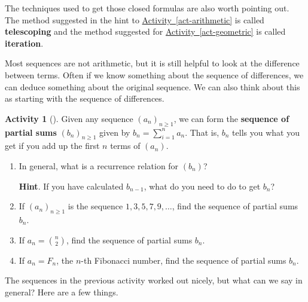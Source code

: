 \documentclass[10pt,]{book}
\newcommand{\terminology}[1]{\textbf{#1}}
\theoremstyle{plain}
\theoremstyle{definition}
\theoremstyle{definition}
\theoremstyle{definition}
\newtheorem{activity}[project]{Activity}
\numberwithin{equation}{chapter}
\begin{document}
\par
\hypertarget{p-929}{}%
The techniques used to get those closed formulas are also worth pointing out.  The method suggested in the hint to \hyperref[act-arithmetic]{Activity~\ref{act-arithmetic}} is called \terminology{telescoping} and the method suggested for \hyperref[act-geometric]{Activity~\ref{act-geometric}} is called \terminology{iteration}.%
\par
\hypertarget{p-930}{}%
Most sequences are not arithmetic, but it is still helpful to look at the difference between terms.  Often if we know something about the sequence of differences, we can deduce something about the original sequence.   We can also think about this as starting with the sequence of differences.%
\begin{activity}[]\label{activity-138}
\hypertarget{p-931}{}%
Given any sequence \((a_n)_{n \ge 1}\), we can form the \terminology{sequence of partial sums} \((b_n)_{n \ge 1}\) given by \(b_n = \sum_{i = 1}^n a_n\).  That is, \(b_n\) tells you what you get if you add up the first \(n\) terms of \((a_n)\).%
\begin{enumerate}[font=\bfseries,label=(\alph*),ref=\alph*]
\item\label{task-173} \hypertarget{p-932}{}%
In general, what is a recurrence relation for \((b_n)\)?%
\par\smallskip%
\noindent\textbf{Hint}.\hypertarget{hint-104}{}\quad%
\hypertarget{p-933}{}%
If you have calculated \(b_{n-1}\), what do you need to do to get \(b_n\)?%
\item\label{task-174} \hypertarget{p-934}{}%
If \((a_n)_{n \ge 1}\) is the sequence \(1, 3, 5, 7, 9, \ldots\), find the sequence of partial sums \(b_n\).%
\item\label{task-175} \hypertarget{p-935}{}%
If \(a_n = \binom{n}{2}\), find the sequence of partial sums \(b_n\).%
\item\label{task-176} \hypertarget{p-936}{}%
If \(a_n = F_n\), the \(n\)-th Fibonacci number, find the sequence of partial sums \(b_n\).%
\end{enumerate}
\end{activity}
\hypertarget{p-937}{}%
The sequences in the previous activity worked out nicely, but what can we say in general?  Here are a few things.%
\end{document}

